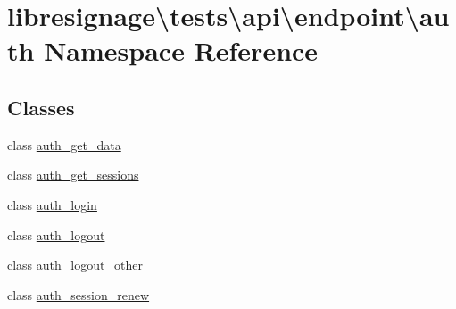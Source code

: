 \hypertarget{namespacelibresignage_1_1tests_1_1api_1_1endpoint_1_1auth}{}\section{libresignage\textbackslash{}tests\textbackslash{}api\textbackslash{}endpoint\textbackslash{}auth Namespace Reference}
\label{namespacelibresignage_1_1tests_1_1api_1_1endpoint_1_1auth}
\subsection*{Classes}
\begin{DoxyCompactItemize}
\item 
class \hyperlink{classlibresignage_1_1tests_1_1api_1_1endpoint_1_1auth_1_1auth__get__data}{auth\+\_\+get\+\_\+data}
\item 
class \hyperlink{classlibresignage_1_1tests_1_1api_1_1endpoint_1_1auth_1_1auth__get__sessions}{auth\+\_\+get\+\_\+sessions}
\item 
class \hyperlink{classlibresignage_1_1tests_1_1api_1_1endpoint_1_1auth_1_1auth__login}{auth\+\_\+login}
\item 
class \hyperlink{classlibresignage_1_1tests_1_1api_1_1endpoint_1_1auth_1_1auth__logout}{auth\+\_\+logout}
\item 
class \hyperlink{classlibresignage_1_1tests_1_1api_1_1endpoint_1_1auth_1_1auth__logout__other}{auth\+\_\+logout\+\_\+other}
\item 
class \hyperlink{classlibresignage_1_1tests_1_1api_1_1endpoint_1_1auth_1_1auth__session__renew}{auth\+\_\+session\+\_\+renew}
\end{DoxyCompactItemize}
